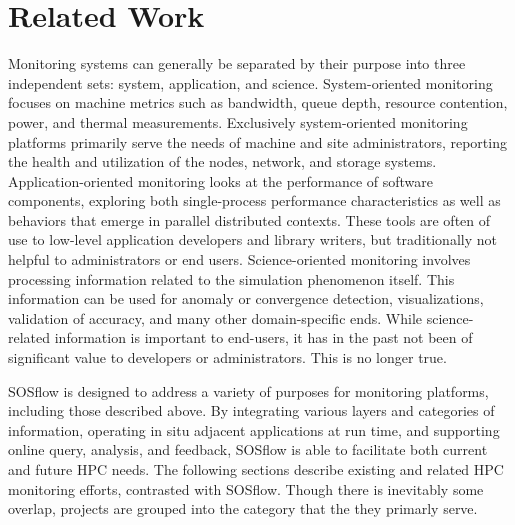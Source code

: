 
\section{Related Work}
%
Monitoring systems can generally be separated by their purpose into three
independent sets: system, application, and science.
%
System-oriented monitoring focuses on machine metrics such as bandwidth,
queue depth, resource contention, power, and thermal measurements.
%
Exclusively system-oriented monitoring platforms primarily serve the
needs of machine and site administrators, reporting the health and utilization
of the nodes, network, and storage systems.
%
Application-oriented monitoring looks at the performance of software components,
exploring both single-process performance characteristics as well as behaviors
that emerge in parallel distributed contexts.
%
These tools are often of use to low-level application developers and library
writers, but traditionally not helpful to administrators or end users.
%
Science-oriented monitoring involves processing information related to the
simulation phenomenon itself.
%
This information can be used for anomaly or convergence detection,
visualizations, validation of accuracy, and many other domain-specific ends.
%
While science-related information is important to end-users, it has in the
past not been of significant value to developers or administrators.
%
This is no longer true.
%
\par
{}
\par
%
%
SOSflow is designed to address a variety of purposes for monitoring platforms,
including those described above.
%
By integrating various layers and categories of information, operating in
situ adjacent applications at run time, and supporting online query,
analysis, and feedback, SOSflow is able to facilitate both current and
future HPC needs.
%
The following sections describe existing and related HPC monitoring efforts,
contrasted with SOSflow.
%
Though there is inevitably some overlap, projects are grouped into
the category that the they primarly serve.
%
